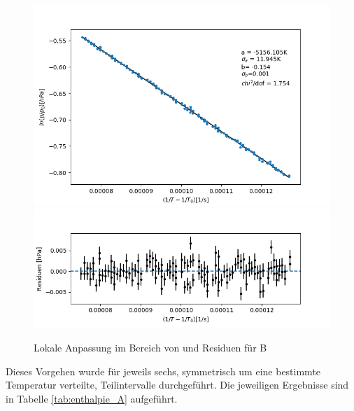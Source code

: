 \documentclass[12pt,a4paper]{article}
\begin{document}
\begin{figure}[H]
\begin{center}
\includegraphics[width=\linewidth]{Bilder/lokaler_fit_2B}\\
\includegraphics[width=\linewidth]{Bilder/lokale_residuen_2B}
\caption[Lokale Anpassung]{Lokale Anpassung im Bereich von  und Residuen für B}
\label{fig:fit_2B}
\end{center}
\end{figure}


Dieses Vorgehen wurde für jeweils sechs, symmetrisch um eine bestimmte Temperatur verteilte, Teilintervalle durchgeführt. Die jeweiligen Ergebnisse sind in Tabelle \ref{tab:enthalpie_A}
aufgeführt.\\
\end{document}
